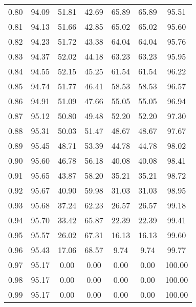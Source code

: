 \begin{tabular}{|c|c|c|c|c|c|c|}
      0.80 &     94.09 &     51.81 &      42.69 &   65.89 &      65.89 &         95.51 \\
      0.81 &     94.13 &     51.66 &      42.85 &   65.02 &      65.02 &         95.60 \\
      0.82 &     94.23 &     51.72 &      43.38 &   64.04 &      64.04 &         95.76 \\
      0.83 &     94.37 &     52.02 &      44.18 &   63.23 &      63.23 &         95.95 \\
      0.84 &     94.55 &     52.15 &      45.25 &   61.54 &      61.54 &         96.22 \\
      0.85 &     94.74 &     51.77 &      46.41 &   58.53 &      58.53 &         96.57 \\
      0.86 &     94.91 &     51.09 &      47.66 &   55.05 &      55.05 &         96.94 \\
      0.87 &     95.12 &     50.80 &      49.48 &   52.20 &      52.20 &         97.30 \\
      0.88 &     95.31 &     50.03 &      51.47 &   48.67 &      48.67 &         97.67 \\
      0.89 &     95.45 &     48.71 &      53.39 &   44.78 &      44.78 &         98.02 \\
      0.90 &     95.60 &     46.78 &      56.18 &   40.08 &      40.08 &         98.41 \\
      0.91 &     95.65 &     43.87 &      58.20 &   35.21 &      35.21 &         98.72 \\
      0.92 &     95.67 &     40.90 &      59.98 &   31.03 &      31.03 &         98.95 \\
      0.93 &     95.68 &     37.24 &      62.23 &   26.57 &      26.57 &         99.18 \\
      0.94 &     95.70 &     33.42 &      65.87 &   22.39 &      22.39 &         99.41 \\
      0.95 &     95.57 &     26.02 &      67.31 &   16.13 &      16.13 &         99.60 \\
      0.96 &     95.43 &     17.06 &      68.57 &    9.74 &       9.74 &         99.77 \\
      0.97 &     95.17 &      0.00 &       0.00 &    0.00 &       0.00 &        100.00 \\
      0.98 &     95.17 &      0.00 &       0.00 &    0.00 &       0.00 &        100.00 \\
      0.99 &     95.17 &      0.00 &       0.00 &    0.00 &       0.00 &        100.00 \\
\bottomrule
\end{tabular}
